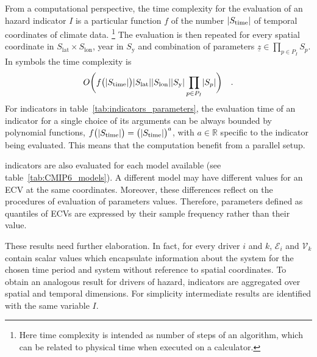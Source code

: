 From a computational perspective, the time complexity for the evaluation of an \gls{hazard} \gls{indicator} $I$ is a particular function $f$ of the number $\lvert S_\text{time}\rvert$ of temporal coordinates of climate data.%
\footnote{Here time complexity is intended as number of steps of an algorithm, which can be related to physical time when executed on a calculator.}
The evaluation is then repeated for every spatial coordinate in $S_\text{lat} \times S_\text{lon}$, year in $S_\text{y}$ and combination of parameters $\underline{z} \in \prod_{p \in P_I} S_p$. In symbols the time complexity is
\begin{equation}
  \label{eq:complexity_parameters}
  O \bigg( f \big( \lvert S_\text{time}\rvert \big) \lvert S_\text{lat}\rvert \lvert S_\text{lon}\rvert \lvert S_\text{y}\rvert \prod_{p \in P_I} \lvert S_p\rvert \bigg)
  \quad .
\end{equation}
For indicators in table~\ref{tab:indicators_parameters}, the evaluation time of an indicator for a single choice of its arguments can be always bounded by polynomial functions, $f \big( \lvert S_\text{time}\rvert \big) = \big( \lvert S_\text{time}\rvert \big)^a $, with $a \in \mathbb{R}$ specific to the indicator being evaluated. This means that the computation benefit from a parallel setup.

\Glspl{indicator} are also evaluated for each model available (see table~\ref{tab:CMIP6_models}). A different model may have different values for an \gls{ECV} at the same coordinates. Moreover, these differences reflect on the procedures of evaluation of parameters values. Therefore, parameters defined as quantiles of \glspl{ECV} are expressed by their sample frequency rather than their value.

These results need further elaboration. In fact, for every \gls{driver} $i$ and $k$, $\mathcal{E}_i$ and $\mathcal{V}_k$ contain scalar values which encapsulate information about the system for the chosen time period and system without reference to spatial coordinates. To obtain an analogous result for \glspl{driver} of \gls{hazard}, \glspl{indicator} are aggregated over spatial and temporal dimensions. For simplicity intermediate results are identified with the same variable $I$.

